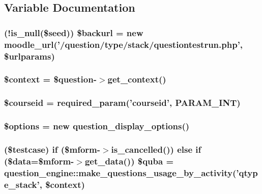 \subsection{Variable Documentation}
\hypertarget{questiontestedit_8php_a28d8c96a7ddca2daae7a03f1567d1c3a}{
\subsubsection[{\$backurl}]{ (!is\_\-null(\$seed)) \$backurl = new moodle\_\-url('/question/type/stack/questiontestrun.php', \$urlparams)}}
\label{questiontestedit_8php_a28d8c96a7ddca2daae7a03f1567d1c3a}
\hypertarget{questiontestedit_8php_ae05dedb802ada0155efdece2044fed64}{
\subsubsection[{\$context}]{\setlength{\rightskip}{0pt plus 5cm}\$context = \$question-\/$>$get\_\-context()}}
\label{questiontestedit_8php_ae05dedb802ada0155efdece2044fed64}
\hypertarget{questiontestedit_8php_a2a1b481ca3e5ae5c2d7a66d271302f23}{
\subsubsection[{\$courseid}]{\setlength{\rightskip}{0pt plus 5cm}\$courseid = required\_\-param('courseid', PARAM\_\-INT)}}
\label{questiontestedit_8php_a2a1b481ca3e5ae5c2d7a66d271302f23}
\hypertarget{questiontestedit_8php_a011800c63ece4cbbfa77136a20607023}{
\subsubsection[{\$options}]{\setlength{\rightskip}{0pt plus 5cm}\$options = new question\_\-display\_\-options()}}
\label{questiontestedit_8php_a011800c63ece4cbbfa77136a20607023}
\hypertarget{questiontestedit_8php_a428cf78a4e358b21d9f845e0ce3d592c}{
\subsubsection[{\$quba}]{ (\$testcase) {\bf if} (\$mform-\/$>$is\_\-cancelled()) else {\bf if} (\$data=\$mform-\/$>$get\_\-data()) \$quba = question\_\-engine::make\_\-questions\_\-usage\_\-by\_\-activity('{\bf qtype\_\-stack}', \$context)}}
